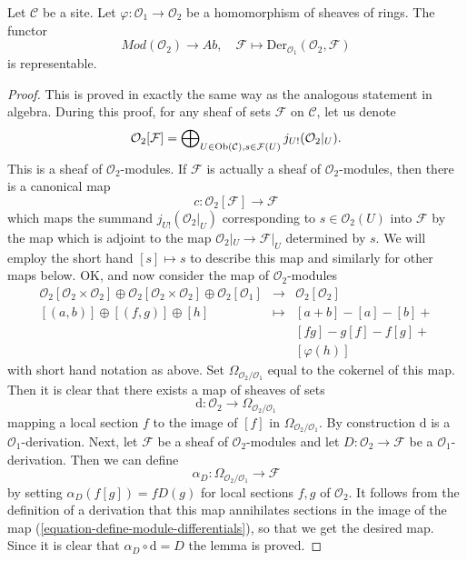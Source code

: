 \begin{lemma}
\label{lemma-universal-module}
Let $\mathcal{C}$ be a site. Let $\varphi : \mathcal{O}_1 \to \mathcal{O}_2$
be a homomorphism of sheaves of rings. The functor
$$
\textit{Mod}(\mathcal{O}_2) \longrightarrow \textit{Ab}, \quad
\mathcal{F} \longmapsto \text{Der}_{\mathcal{O}_1}(\mathcal{O}_2, \mathcal{F})
$$
is representable.
\end{lemma}

\begin{proof}
This is proved in exactly the same way as the analogous statement in algebra.
During this proof, for any sheaf of sets $\mathcal{F}$ on $\mathcal{C}$,
let us denote
$$
\mathcal{O}_2[\mathcal{F}]
=
\bigoplus\nolimits_{U \in \mathop{\rm Ob}\nolimits(\mathcal{C}), s \in \mathcal{F}(U)}
j_{U!}(\mathcal{O}_2|_U).
$$
This is a sheaf of $\mathcal{O}_2$-modules.
If $\mathcal{F}$ is actually a sheaf of $\mathcal{O}_2$-modules, then there
is a canonical map
$$
c : \mathcal{O}_2[\mathcal{F}] \longrightarrow \mathcal{F}
$$
which maps the summand $j_{U!}(\mathcal{O}_2|_U)$ corresponding to
$s \in \mathcal{O}_2(U)$ into $\mathcal{F}$ by the map which is
adjoint to the map $\mathcal{O}_2|_U \to \mathcal{F}|_U$ determined by $s$.
We will employ the short hand $[s] \mapsto s$ to
describe this map and similarly for other maps below. OK, and now consider
the map of $\mathcal{O}_2$-modules
\begin{equation}
\label{equation-define-module-differentials}
\begin{matrix}
\mathcal{O}_2[\mathcal{O}_2 \times \mathcal{O}_2] \oplus
\mathcal{O}_2[\mathcal{O}_2 \times \mathcal{O}_2] \oplus
\mathcal{O}_2[\mathcal{O}_1] &
\longrightarrow &
\mathcal{O}_2[\mathcal{O}_2] \\
[(a, b)] \oplus [(f, g)] \oplus [h] & \longmapsto & [a + b] - [a] - [b] + \\
& & [fg] - g[f] - f[g] + \\
& & [\varphi(h)]
\end{matrix}
\end{equation}
with short hand notation as above. Set $\Omega_{\mathcal{O}_2/\mathcal{O}_1}$
equal to the cokernel of this map. Then it is clear that there exists
a map of sheaves of sets
$$
\text{d} : \mathcal{O}_2 \longrightarrow \Omega_{\mathcal{O}_2/\mathcal{O}_1}
$$
mapping a local section $f$ to the image of $[f]$ in
$\Omega_{\mathcal{O}_2/\mathcal{O}_1}$. By construction $\text{d}$
is a $\mathcal{O}_1$-derivation. Next, let $\mathcal{F}$
be a sheaf of $\mathcal{O}_2$-modules and let
$D : \mathcal{O}_2 \to \mathcal{F}$ be a $\mathcal{O}_1$-derivation.
Then we can define
$$
\alpha_D : \Omega_{\mathcal{O}_2/\mathcal{O}_1} \longrightarrow \mathcal{F}
$$
by setting $\alpha_D(f[g]) = fD(g)$ for local sections
$f, g$ of $\mathcal{O}_2$. It follows from the definition of a
derivation that this map annihilates sections in the image of the map
(\ref{equation-define-module-differentials}), so that we get the
desired map. Since it is clear that $\alpha_D \circ \text{d} = D$
the lemma is proved.
\end{proof}

